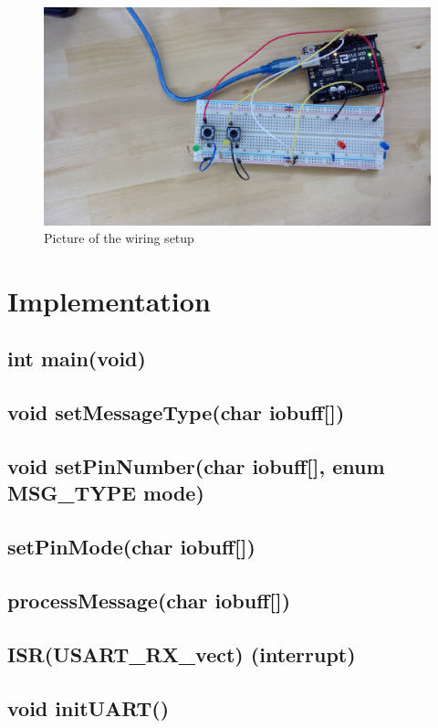 \documentclass[letterpaper,11pt]{texMemo} %
\begin{document}
\begin{figure}[!ht]
\begin{center}
\includegraphics[width=\linewidth]{./configuration.jpg}
\caption{Picture of the wiring setup}
\end{center}
\end{figure}

\newpage
\section*{Implementation}

\subsection*{int main(void)}
\subsection*{void setMessageType(char iobuff[])}
\subsection*{void setPinNumber(char iobuff[], enum MSG_TYPE mode)}
\subsection*{setPinMode(char iobuff[])}
\subsection*{processMessage(char iobuff[])}
\subsection*{ISR(USART_RX_vect) (interrupt)}
\subsection*{void initUART()}
\end{document}
